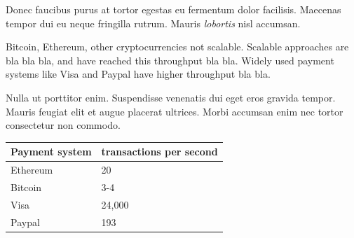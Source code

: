 \documentclass[portrait,a0paper,fontscale=0.285]{baposter} %
\begin{document}
\begin{poster}
{Donec faucibus purus at tortor egestas eu fermentum dolor facilisis. Maecenas tempor dui eu neque fringilla rutrum. Mauris \emph{lobortis} nisl accumsan.

Bitcoin, Ethereum, other cryptocurrencies not scalable.  Scalable approaches are bla bla bla, and have reached this throughput bla bla.  Widely used payment systems like Visa and Paypal have higher throughput bla bla.

Nulla ut porttitor enim. Suspendisse venenatis dui eget eros gravida tempor. Mauris feugiat elit et augue placerat ultrices. Morbi accumsan enim nec tortor consectetur non commodo.

\begin{center}
\begin{tabular}{l l}
\toprule
\textbf{Payment system} & \textbf{transactions per second} \\
\midrule
Ethereum & 20 \\
Bitcoin & 3-4 \\
Visa & 24,000 \\
Paypal &  193 \\
\bottomrule
\end{tabular}
\end{center}
}


\end{poster}
\end{document}
